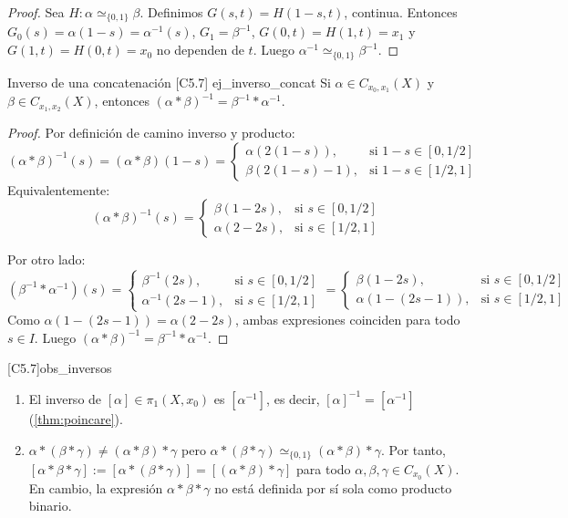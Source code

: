 \begin{proof}
Sea $H \colon \alpha \simeq_{\{0,1\}} \beta$. Definimos $G(s,t) = H(1-s,t)$, continua. Entonces $G_0(s) = \alpha(1-s) = \alpha^{-1}(s)$, $G_1 = \beta^{-1}$, $G(0,t) = H(1,t) = x_1$ y $G(1,t) = H(0,t) = x_0$ no dependen de $t$. Luego $\alpha^{-1} \simeq_{\{0,1\}} \beta^{-1}$.
\end{proof}

\begin{proposicion}{Inverso de una concatenación [C5.7] \marcaE}{ej_inverso_concat}
Si $\alpha \in C_{x_0, x_1}(X)$ y $\beta \in C_{x_1, x_2}(X)$, entonces $(\alpha * \beta)^{-1} = \beta^{-1} * \alpha^{-1}$.
\end{proposicion}
\begin{proof}
Por definición de camino inverso y producto:
\[
(\alpha * \beta)^{-1}(s) = (\alpha * \beta)(1-s) = 
\begin{cases} 
\alpha(2(1-s)), & \text{si } 1-s \in [0, 1/2] \\ 
\beta(2(1-s)-1), & \text{si } 1-s \in [1/2, 1] 
\end{cases}
\]
Equivalentemente:
\[
(\alpha * \beta)^{-1}(s) =
\begin{cases} 
\beta(1-2s), & \text{si } s \in [0, 1/2] \\ 
\alpha(2-2s), & \text{si } s \in [1/2, 1] 
\end{cases}
\]

Por otro lado:
\[
(\beta^{-1} * \alpha^{-1})(s) = 
\begin{cases} 
\beta^{-1}(2s), & \text{si } s \in [0, 1/2] \\ 
\alpha^{-1}(2s-1), & \text{si } s \in [1/2, 1] 
\end{cases}
= 
\begin{cases} 
\beta(1-2s), & \text{si } s \in [0, 1/2] \\ 
\alpha(1-(2s-1)), & \text{si } s \in [1/2, 1] 
\end{cases}
\]
Como $\alpha(1-(2s-1)) = \alpha(2-2s)$, ambas expresiones coinciden para todo $s \in I$. Luego $(\alpha * \beta)^{-1} = \beta^{-1} * \alpha^{-1}$.
\end{proof}

\begin{observacion}{ [C5.7]}{obs_inversos}
\begin{enumerate}
    \item El inverso de $[\alpha] \in \pi_1(X, x_0)$ es $[\alpha^{-1}]$, es decir, $[\alpha]^{-1} = [\alpha^{-1}]$ (\cref{thm:poincare}).
    \item $\alpha * (\beta * \gamma) \ne (\alpha * \beta) * \gamma$ pero $\alpha * (\beta * \gamma) \simeq_{\{0,1\}} (\alpha * \beta) * \gamma$. Por tanto, $[\alpha * \beta * \gamma] := [\alpha * (\beta * \gamma)] = [(\alpha * \beta) * \gamma]$ para todo $\alpha,\beta,\gamma \in C_{x_0}(X)$. En cambio, la expresión $\alpha * \beta * \gamma$ no está definida por sí sola como producto binario.
\end{enumerate}
\end{observacion}

